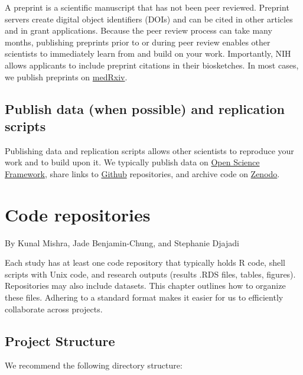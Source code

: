 \documentclass[
]{book}
\begin{document}
A preprint is a scientific manuscript that has not been peer reviewed. Preprint servers create digital object identifiers (DOIs) and can be cited in other articles and in grant applications. Because the peer review process can take many months, publishing preprints prior to or during peer review enables other scientists to immediately learn from and build on your work. Importantly, NIH allows applicants to include preprint citations in their biosketches. In most cases, we publish preprints on \href{https://www.medrxiv.org/}{medRxiv}.

\hypertarget{publish-data-when-possible-and-replication-scripts}{%
\section{Publish data (when possible) and replication scripts}\label{publish-data-when-possible-and-replication-scripts}}

Publishing data and replication scripts allows other scientists to reproduce your work and to build upon it. We typically publish data on \href{osf.io}{Open Science Framework}, share links to \href{github.com}{Github} repositories, and archive code on \href{zenodo.org}{Zenodo}.

\hypertarget{code-repositories}{%
\chapter{Code repositories}\label{code-repositories}}

By Kunal Mishra, Jade Benjamin-Chung, and Stephanie Djajadi

Each study has at least one code repository that typically holds R code, shell scripts with Unix code, and research outputs (results .RDS files, tables, figures). Repositories may also include datasets. This chapter outlines how to organize these files. Adhering to a standard format makes it easier for us to efficiently collaborate across projects.

\hypertarget{project-structure}{%
\section{Project Structure}\label{project-structure}}

We recommend the following directory structure:
\end{document}
